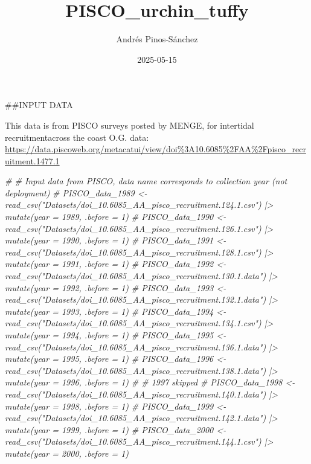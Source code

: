 \documentclass[
]{article}
\title{PISCO\_urchin\_tuffy}
\author{Andrés Pinos-Sánchez}
\date{2025-05-15}
\newenvironment{Shaded}{\begin{snugshade}}{\end{snugshade}}
\newcommand{\CommentTok}[1]{\textcolor[rgb]{0.56,0.35,0.01}{\textit{#1}}}
\begin{document}
\maketitle

\#\#INPUT DATA

This data is from PISCO surveys posted by MENGE, for intertidal
recruitmentacross the coast O.G. data:
\url{https://data.piscoweb.org/metacatui/view/doi\%3A10.6085\%2FAA\%2Fpisco_recruitment.1477.1}

\begin{Shaded}
\begin{Highlighting}[]
\CommentTok{\# \# Input data from PISCO, data name corresponds to collection year (not deployment)}
\CommentTok{\# PISCO\_data\_1989 \textless{}{-} read\_csv("Datasets/doi\_10.6085\_AA\_pisco\_recruitment.124.1.csv")  |\textgreater{} mutate(year = 1989, .before = 1)}
\CommentTok{\# PISCO\_data\_1990 \textless{}{-} read\_csv("Datasets/doi\_10.6085\_AA\_pisco\_recruitment.126.1.csv")  |\textgreater{} mutate(year = 1990, .before = 1)}
\CommentTok{\# PISCO\_data\_1991 \textless{}{-} read\_csv("Datasets/doi\_10.6085\_AA\_pisco\_recruitment.128.1.csv")  |\textgreater{} mutate(year = 1991, .before = 1)}
\CommentTok{\# PISCO\_data\_1992 \textless{}{-} read\_csv("Datasets/doi\_10.6085\_AA\_pisco\_recruitment.130.1.data") |\textgreater{} mutate(year = 1992, .before = 1)}
\CommentTok{\# PISCO\_data\_1993 \textless{}{-} read\_csv("Datasets/doi\_10.6085\_AA\_pisco\_recruitment.132.1.data") |\textgreater{} mutate(year = 1993, .before = 1)}
\CommentTok{\# PISCO\_data\_1994 \textless{}{-} read\_csv("Datasets/doi\_10.6085\_AA\_pisco\_recruitment.134.1.csv")  |\textgreater{} mutate(year = 1994, .before = 1)}
\CommentTok{\# PISCO\_data\_1995 \textless{}{-} read\_csv("Datasets/doi\_10.6085\_AA\_pisco\_recruitment.136.1.data") |\textgreater{} mutate(year = 1995, .before = 1)}
\CommentTok{\# PISCO\_data\_1996 \textless{}{-} read\_csv("Datasets/doi\_10.6085\_AA\_pisco\_recruitment.138.1.data") |\textgreater{} mutate(year = 1996, .before = 1)}
\CommentTok{\# \# 1997 skipped}
\CommentTok{\# PISCO\_data\_1998 \textless{}{-} read\_csv("Datasets/doi\_10.6085\_AA\_pisco\_recruitment.140.1.data") |\textgreater{} mutate(year = 1998, .before = 1)}
\CommentTok{\# PISCO\_data\_1999 \textless{}{-} read\_csv("Datasets/doi\_10.6085\_AA\_pisco\_recruitment.142.1.data") |\textgreater{} mutate(year = 1999, .before = 1)}
\CommentTok{\# PISCO\_data\_2000 \textless{}{-} read\_csv("Datasets/doi\_10.6085\_AA\_pisco\_recruitment.144.1.csv")  |\textgreater{} mutate(year = 2000, .before = 1)}

\end{Highlighting}
\end{Shaded}
\end{document}
